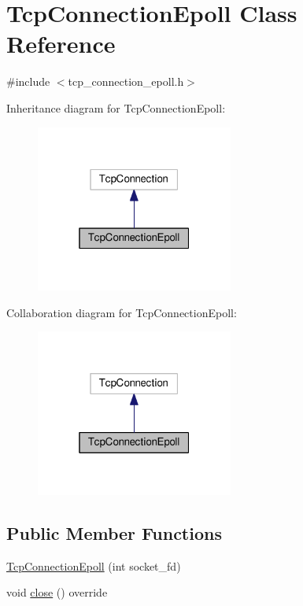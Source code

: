 \hypertarget{classTcpConnectionEpoll}{}\section{Tcp\+Connection\+Epoll Class Reference}
\label{classTcpConnectionEpoll}


{\ttfamily \#include $<$tcp\+\_\+connection\+\_\+epoll.\+h$>$}



Inheritance diagram for Tcp\+Connection\+Epoll\+:
\nopagebreak
\begin{figure}[H]
\begin{center}
\leavevmode
\includegraphics[width=184pt]{classTcpConnectionEpoll__inherit__graph}
\end{center}
\end{figure}


Collaboration diagram for Tcp\+Connection\+Epoll\+:
\nopagebreak
\begin{figure}[H]
\begin{center}
\leavevmode
\includegraphics[width=184pt]{classTcpConnectionEpoll__coll__graph}
\end{center}
\end{figure}
\subsection*{Public Member Functions}
\begin{DoxyCompactItemize}
\item 
\hyperlink{classTcpConnectionEpoll_a8a0d4fe2dc75d4e6f29f0221aeb16516}{Tcp\+Connection\+Epoll} (int socket\+\_\+fd)
\item 
void \hyperlink{classTcpConnectionEpoll_a6109a1ddd496e5307888d2c70fffc2c6}{close} () override
\end{DoxyCompactItemize}


